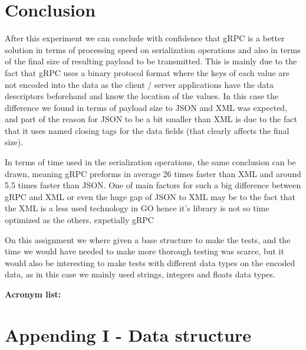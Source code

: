 \documentclass{article}
\begin{document}
\qquad 

\section{Conclusion}

\qquad After this experiment we can conclude with confidence that \ac{gRPC} is a better solution in terms of processing speed on serialization operations and also in terms of the final size of resulting payload to be transmitted. This is mainly due to the fact that \ac{gRPC} uses a binary protocol format where the keys of each value are not encoded into the data as the client / server applications have the data descriptors beforehand and know the location of the values. In this case the difference we found in terms of payload size to \ac{JSON} and \ac{XML} was expected, and part of the reason for \ac{JSON} to be a bit smaller than \ac{XML} is due to the fact that it uses named closing tags for the data fields (that clearly affects the final size).

\qquad In terms of time used in the serialization operations, the same conclusion can be drawn, meaning \ac{gRPC} preforms in average 26 times faster than \ac{XML} and around 5.5 times faster than \ac{JSON}. One of main factors for such a big difference between \ac{gRPC} and \ac{XML} or even the huge gap of \ac{JSON} to \ac{XML} may be to the fact that the \ac{XML} is a less used technology in GO hence it's library is not so time optimized as the others, expetially \ac{gRPC}

\qquad On this assignment we where given a base structure to make the tests, and the time we would have needed to make more thorough testing was scarce, but it would also be interesting to make tests with different data types on the encoded data, as in this case we mainly used strings, integers and floats data types.\newline\newline

\textbf{Acronym list:}

\begin{acronym}
\end{acronym}


\setcounter{secnumdepth}{0}
\break
\section{Appending I - Data structure}
\end{document}
